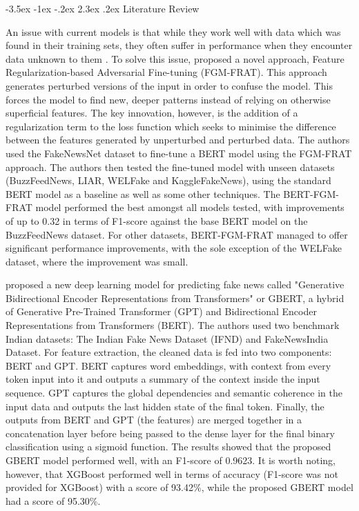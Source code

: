 \documentclass[
]{article}
\makeatletter
\renewcommand\section{\@startsection{section}{1}{\z@}%
  {-3.5ex \@plus -1ex \@minus -.2ex}%
  {2.3ex \@plus .2ex}%
  {\normalfont\fontsize{12}{14}\selectfont\bfseries}}
\makeatother
\begin{document}
\section{Literature Review}

An issue with current models is that while they work well with data which was found in their training sets, they often suffer in performance when they encounter data unknown to them \parencite{BERT-finetuning}. To solve this issue, \textcite{BERT-finetuning} proposed a novel approach, Feature Regularization-based Adversarial Fine-tuning (FGM-FRAT). This approach generates perturbed versions of the input in order to confuse the model. This forces the model to find new, deeper patterns instead of relying on otherwise superficial features. The key innovation, however, is the addition of a regularization term to the loss function which seeks to minimise the difference between the features generated by unperturbed and perturbed data. The authors used the FakeNewsNet dataset to fine-tune a BERT model using the FGM-FRAT approach. The authors then tested the fine-tuned model with unseen datasets (BuzzFeedNews, LIAR, WELFake and KaggleFakeNews), using the standard BERT model as a baseline as well as some other techniques. The BERT-FGM-FRAT model performed the best amongst all models tested, with improvements of up to 0.32 in terms of F1-score against the base BERT model on the BuzzFeedNews dataset. For other datasets, BERT-FGM-FRAT managed to offer significant performance improvements, with the sole exception of the WELFake dataset, where the improvement was small.

\textcite{gbert} proposed a new deep learning model for predicting fake news called "Generative Bidirectional Encoder Representations from Transformers" or GBERT, a hybrid of Generative Pre-Trained Transformer (GPT) and Bidirectional Encoder Representations from Transformers (BERT). The authors used two benchmark Indian datasets: The Indian Fake News Dataset (IFND) and FakeNewsIndia Dataset. For feature extraction, the cleaned data is fed into two components: BERT and GPT. BERT captures word embeddings, with context from every token input into it and outputs a summary of the context inside the input sequence. GPT captures the global dependencies and semantic coherence in the input data and outputs the last hidden state of the final token. Finally, the outputs from BERT and GPT (the features) are merged together in a concatenation layer before being passed to the dense layer for the final binary classification using a sigmoid function. The results showed that the proposed GBERT model performed well, with an F1-score of 0.9623. It is worth noting, however, that XGBoost performed well in terms of accuracy (F1-score was not provided for XGBoost) with a score of 93.42\%, while the proposed GBERT model had a score of 95.30\%.
\end{document}
